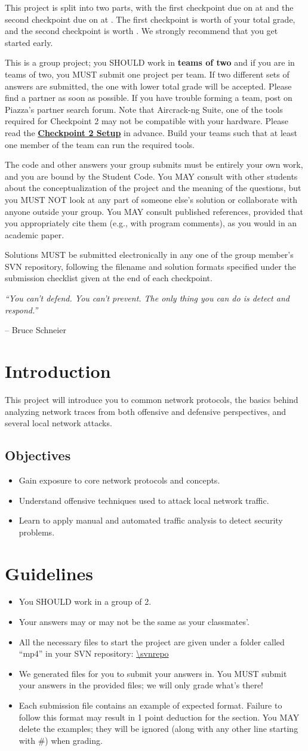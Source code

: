 \documentclass[letterpaper,12pt]{report}
\newcommand{\htitle}
{
     \noindent\parbox{\textwidth}
    {
        \course\hfill \distdate\newline
        \coursename\hfill 
        \settitle \vspace*{-.5ex}\newline
        \mbox{}\hrulefill\mbox{}
    }
    \vspace{8pt}
    \begin{center}{\Large\bf{\settitle}}\end{center}
}
\newcommand{\handout}
{
    \thispagestyle{empty}
    \markboth{}{}
    \pagestyle{plain}
    \htitle
}
\newcommand{\problemsetheader}
{
\setlength{\parindent}{0pt}

\medskip

This project is split into two parts, with the first checkpoint due on {\bf \checkpointduedate} at {\bf \duetime} and the second checkpoint due on {\bf \duedate} at {\bf \duetime}.
The first checkpoint is worth {\firstcheckpointpercent} of your total grade, and the second checkpoint is worth \secondcheckpointpercent.
We strongly recommend that you get started early.

\medskip

This is a group project; you SHOULD work in \textbf{teams of two} and if you are in teams of two, you MUST submit one project per team.
If two different sets of answers are submitted, the one with lower total grade will be accepted.
Please find a partner as soon as possible.
If you have trouble forming a team, post on Piazza's partner search forum.
Note that Aircrack-ng Suite, one of the tools required for Checkpoint 2 may not be compatible with your hardware.
Please read the \textbf{\hyperlink{cp2setup}{Checkpoint 2 Setup}} in advance. Build your teams such that at least one member of the team can run the required tools.

\medskip

The code and other answers your group submits must be entirely your own work, and you are bound by the Student Code.
You MAY consult with other students about the conceptualization of the project and the meaning of the questions, but you MUST NOT look at any part of someone else's solution or collaborate with anyone outside your group.
You MAY consult published references, provided that you appropriately cite them (e.g., with program comments), as you would in an academic paper.

\medskip

Solutions MUST be submitted electronically in any one of the group member's SVN repository, following the filename and solution formats specified under the submission checklist given at the end of each checkpoint.

\medskip

\hrulefill

\medskip
}
\begin{document}
\handout
\problemsetheader
\medskip
\noindent
\emph{``You can't defend. You can't prevent. The only thing you can do is detect and respond.''}

\begingroup\raggedleft
-- Bruce Schneier\\
\endgroup

\newpage

\section*{Introduction}

This project will introduce you to common network protocols, the basics behind analyzing network traces from both offensive and defensive perspectives, and several local network attacks.

\vspace{-6pt}
\subsection*{Objectives}
\begin{itemize}
\item Gain exposure to core network protocols and concepts.
\item Understand offensive techniques used to attack local network traffic.
\item Learn to apply manual and automated traffic analysis to detect security problems.
\end{itemize}

\section*{Guidelines}
\begin{itemize}
\item You SHOULD work in a group of 2.
\item Your answers may or may not be the same as your classmates'.
\item All the necessary files to start the project are given under a folder called ``mp4'' in your SVN repository: \url{\svnrepo}
\item We generated files for you to submit your answers in.
You MUST submit your answers in the provided files; we will only grade what's there!
\item Each submission file contains an example of expected format. Failure to follow this format may result in 1 point deduction for the section. You MAY delete the examples; they will be ignored (along with any other line starting with \#) when grading.
\end{itemize}
\end{document}
